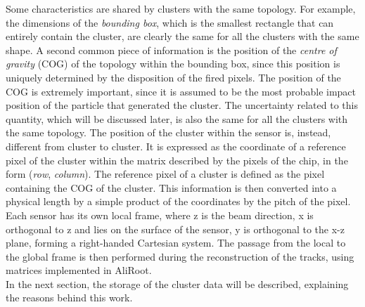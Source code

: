 Some characteristics are shared by clusters with the same topology. For example, the dimensions of the \textit{bounding box}, which is the smallest rectangle that can entirely contain the cluster, are clearly the same for all the clusters with the same shape. A second common piece of information is the position of the \textit{centre of gravity} (COG) of the topology within the bounding box, since this position is uniquely determined by the disposition of the fired pixels. The position of the COG is extremely important, since it is assumed to be the most probable impact position of the particle that generated the cluster. The uncertainty related to this quantity, which will be discussed later, is also the same for all the clusters with the same topology. The position of the cluster within the sensor is, instead, different from cluster to cluster. It is expressed as the coordinate of a reference pixel of the cluster within the matrix described by the pixels of the chip, in the form (\textit{row}, \textit{column}). The reference pixel of a cluster is defined as the pixel containing the COG of the cluster. This information is then converted into a physical length by a simple product of the coordinates by the pitch of the pixel. Each sensor has its own local frame, where z is the beam direction, x is orthogonal to z and lies on the surface of the sensor, y is orthogonal to the x-z plane, forming a right-handed Cartesian system. The passage from the local to the global frame is then performed during the reconstruction of the tracks, using matrices implemented in AliRoot.\\
In the next section, the storage of the cluster data will be described, explaining the reasons behind this work.
